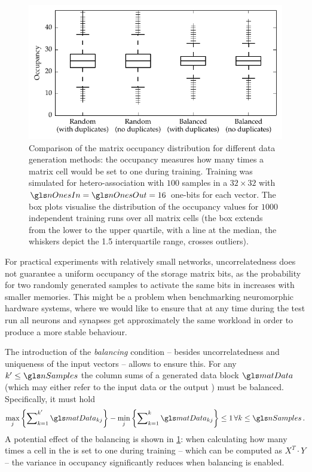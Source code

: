 \begin{figure}
	\centering
	\includegraphics{media/chp3/binam_occupancy_data.pdf}
	\caption[Comparison of the BiNAM matrix occupancy for different data generation methods]{Comparison of the \BiNAM matrix occupancy distribution for different data generation methods: the occupancy measures how many times a \BiNAM matrix cell would be set to one during training. Training was simulated for hetero-association with $100$ samples in a $32 \times 32$ \BiNAM with $\nOnesIn = \nOnesOut = 16$ one-bits for each vector. The box plots visualise the distribution of the occupancy values for $1000$ independent training runs over all matrix cells (the box extends from the lower to the upper quartile, with a line at the median, the whiskers depict the 1.5 interquartile range, crosses outliers).}
	\label{fig:binam_occupancy_data}
\end{figure}

For practical experiments with relatively small networks, uncorrelatedness does not guarantee a uniform occupancy of the storage matrix bits, as the probability for two randomly generated samples to activate the same bits in \memMat increases with smaller memories. This might be a problem when benchmarking neuromorphic hardware systems, where we would like to ensure that at any time during the test run all neurons and synapses get approximately the same workload in order to produce a more stable behaviour.

The introduction of the \emph{balancing} condition -- besides uncorrelatedness and uniqueness of the input vectors -- allows to ensure this. For any $k' \leq \nSamples$ the column sums of a generated data block $\matData$ (which may either refer to the input data \matIn or the output \matOut) must be balanced. Specifically, it must hold
\begin{align}
	\max_j\left\{\sum\nolimits_{k = 1}^{k'} \matData_{kj}\right\} - \min_j\left\{\sum\nolimits_{k = 1}^{k} \matData_{kj}\right\} \leq 1 \, \forall k \leq \nSamples \,.
	\label{eqn:balancing_condition}
\end{align}
A potential effect of the balancing is shown in \cref{fig:binam_occupancy_data}: when calculating how many times a cell in the \BiNAM is set to one during training -- which can be computed as  $X^T \cdot Y$ -- the variance in occupancy significantly reduces when balancing is enabled.

